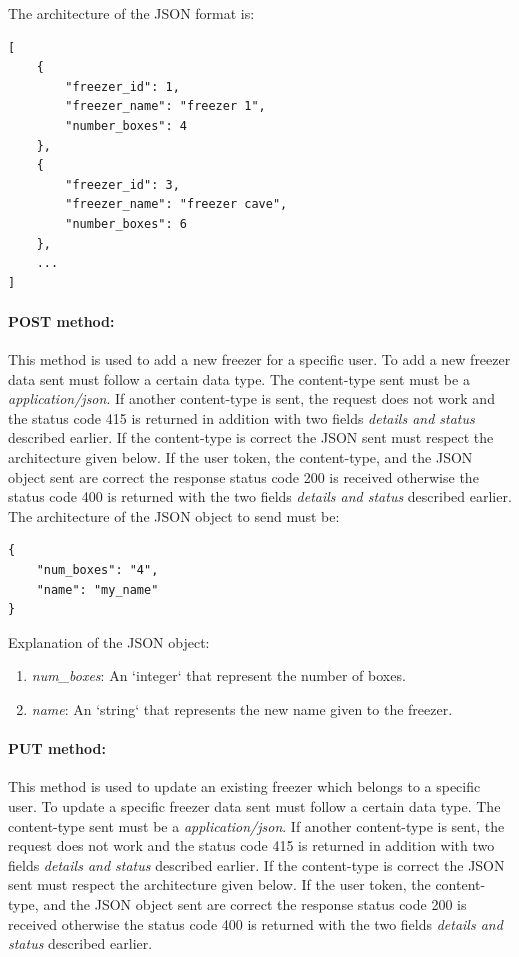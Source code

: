 The architecture of the JSON format is:
\begin{lstlisting}
[
    {
        "freezer_id": 1,
        "freezer_name": "freezer 1",
        "number_boxes": 4
    },
    {
        "freezer_id": 3,
        "freezer_name": "freezer cave",
        "number_boxes": 6
    },
    ...
]
\end{lstlisting}

\paragraph{POST method:} This method is used to add a new freezer for a specific user. To add a new freezer data sent must follow a certain data type. The content-type sent must be a \textit{application/json}. If another content-type is sent, the request does not work and the status code 415 is returned in addition with two fields \textit{details and status} described earlier. If the  content-type is correct the JSON sent must respect the architecture given below. If the user token, the  content-type, and the JSON object sent are correct the response status code 200 is received otherwise the status code 400 is returned with the two fields \textit{details and status} described earlier.\\

The architecture of the JSON object to send must be:
\begin{lstlisting}
{
    "num_boxes": "4",
    "name": "my_name"
}
\end{lstlisting}

Explanation of the  JSON object:
\begin{enumerate}
\item \textit{num\_boxes}: An `integer` that represent the number of boxes.
\item \textit{name}: An `string` that represents the new name given to the freezer.
\end{enumerate}

\paragraph{PUT method:} This method is used to update an existing freezer which belongs to a specific user. To update a specific freezer data sent must follow a certain data type. The content-type sent must be a \textit{application/json}. If another content-type is sent, the request does not work and the status code 415 is returned in addition with two fields \textit{details and status} described earlier. If the  content-type is correct the JSON sent must respect the architecture given below. If the user token, the  content-type, and the JSON object sent are correct the response status code 200 is received otherwise the status code 400 is returned with the two fields \textit{details and status} described earlier.\\

